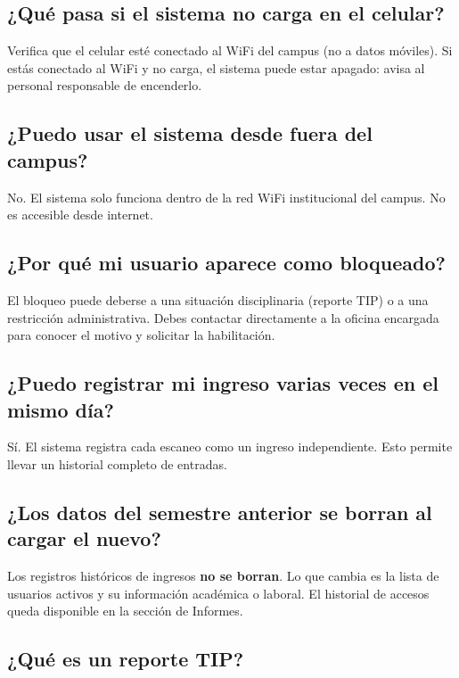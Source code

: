 \documentclass[12pt, a4paper]{article}
\begin{document}
\subsection*{¿Qué pasa si el sistema no carga en el celular?}

Verifica que el celular esté conectado al WiFi del campus (no a datos
móviles). Si estás conectado al WiFi y no carga, el sistema puede
estar apagado: avisa al personal responsable de encenderlo.

\subsection*{¿Puedo usar el sistema desde fuera del campus?}

No. El sistema solo funciona dentro de la red WiFi institucional del
campus. No es accesible desde internet.

\subsection*{¿Por qué mi usuario aparece como bloqueado?}

El bloqueo puede deberse a una situación disciplinaria (reporte TIP)
o a una restricción administrativa. Debes contactar directamente a la
oficina encargada para conocer el motivo y solicitar la habilitación.

\subsection*{¿Puedo registrar mi ingreso varias veces en el mismo día?}

Sí. El sistema registra cada escaneo como un ingreso independiente.
Esto permite llevar un historial completo de entradas.

\subsection*{¿Los datos del semestre anterior se borran al cargar el nuevo?}

Los registros históricos de ingresos \textbf{no se borran}. Lo que
cambia es la lista de usuarios activos y su información académica o
laboral. El historial de accesos queda disponible en la sección de
Informes.

\subsection*{¿Qué es un reporte TIP?}
\end{document}
